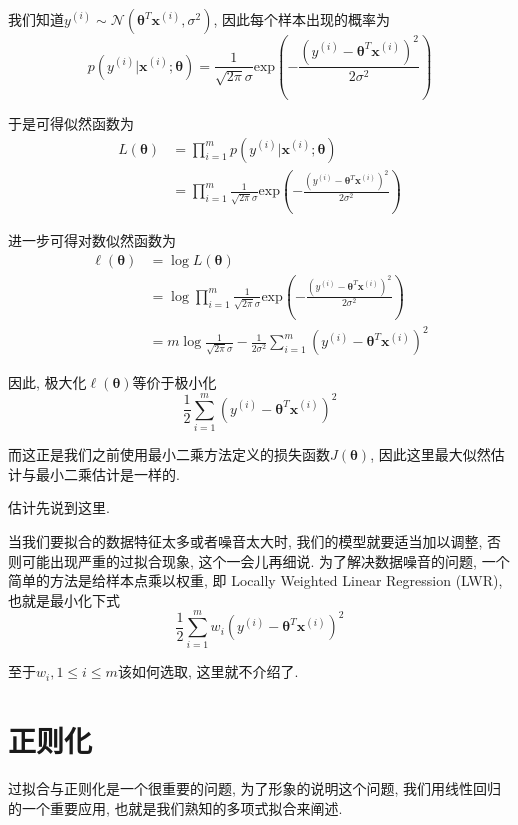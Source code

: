\documentclass[a4paper,UTF8]{ctexart}
\theoremstyle{plain} \newtheorem{theorem}{定理}[section]
\theoremstyle{plain} \newtheorem{definition}{定义}[section]
\theoremstyle{plain} \newtheorem{lemma}{引理}[section]
\theoremstyle{plain} \newtheorem{proposition}{命题}[section]
\theoremstyle{plain} \newtheorem{example}{例}[section]
\theoremstyle{plain} \newtheorem{remark}{注}[section]
\theoremstyle{plain} \newtheorem{corollary}{推论}[section]
\begin{document}
我们知道$y^{(i)} \sim \mathcal{N}(\bm{\theta}^{T} \bm{x}^{(i)}, \sigma^2)$, 因此每个样本出现的概率为
\begin{equation*}
p(y^{(i)} | \bm{x}^{(i)} ; \bm{\theta}) = \frac{1}{\sqrt{2 \pi} \sigma} \mathrm{exp} \left(- \frac{(y^{(i)} - \bm{\theta}^{T} \bm{x}^{(i)})^2}{2 \sigma^2} \right)
\end{equation*}

于是可得似然函数为
\begin{align*}
L(\bm{\theta}) & = \prod_{i=1}^{m} p(y^{(i)} | \bm{x}^{(i)} ; \bm{\theta}) \\ 
& =  \prod_{i=1}^{m} \frac{1}{\sqrt{2 \pi} \sigma} \mathrm{exp} \left(- \frac{(y^{(i)} - \bm{\theta}^{T} \bm{x}^{(i)})^2}{2 \sigma^2} \right)
\end{align*}

进一步可得对数似然函数为
\begin{align*}
\ell (\bm{\theta}) & = \log L(\bm{\theta}) \\ 
& = \log \prod_{i=1}^{m} \frac{1}{\sqrt{2 \pi} \sigma} \mathrm{exp} \left(- \frac{(y^{(i)} - \bm{\theta}^{T} \bm{x}^{(i)})^2}{2 \sigma^2} \right) \\ 
& = m \log \frac{1}{\sqrt{2 \pi} \sigma} - \frac{1}{2 \sigma^2} \sum_{i=1}^{m} (y^{(i)} - \bm{\theta}^{T} \bm{x}^{(i)})^2
\end{align*}

因此, 极大化$\ell (\bm{\theta})$等价于极小化
\begin{equation*}
\frac{1}{2}  \sum_{i=1}^{m} (y^{(i)} - \bm{\theta}^{T} \bm{x}^{(i)})^2
\end{equation*}

而这正是我们之前使用最小二乘方法定义的损失函数$J(\bm{\theta})$, 因此这里最大似然估计与最小二乘估计是一样的.

估计先说到这里.

当我们要拟合的数据特征太多或者噪音太大时, 我们的模型就要适当加以调整, 否则可能出现严重的过拟合现象, 这个一会儿再细说. 为了解决数据噪音的问题, 一个简单的方法是给样本点乘以权重, 即 Locally Weighted Linear Regression (LWR), 也就是最小化下式
\begin{equation*}
\frac{1}{2}  \sum_{i=1}^{m} w_{i}(y^{(i)} - \bm{\theta}^{T} \bm{x}^{(i)})^2
\end{equation*}

至于$w_{i}, 1 \leqslant i \leqslant m$该如何选取, 这里就不介绍了.



\section{正则化}
过拟合与正则化是一个很重要的问题, 为了形象的说明这个问题, 我们用线性回归的一个重要应用, 也就是我们熟知的多项式拟合来阐述.
\end{document}
